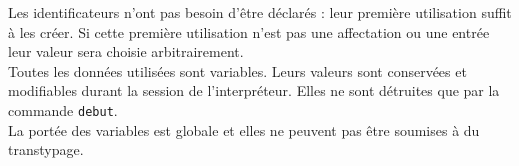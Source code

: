 Les identificateurs n'ont pas besoin d'être déclarés : leur première utilisation suffit à les créer.
Si cette première utilisation n'est pas une affectation ou une entrée leur valeur sera choisie arbitrairement.\\
Toutes les données utilisées sont variables. Leurs valeurs sont conservées et modifiables durant la session de l'interpréteur. Elles ne sont détruites que par la commande \verb|debut|.\\
La portée des variables est globale et elles ne peuvent pas être soumises à du transtypage.
